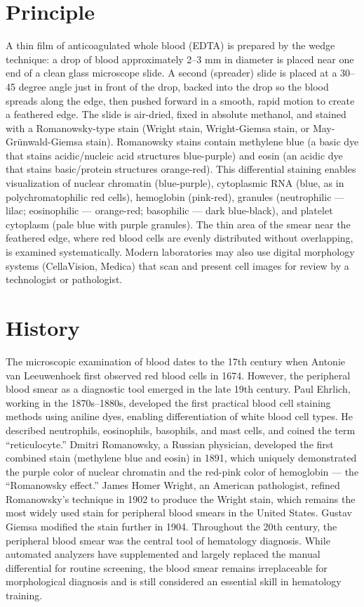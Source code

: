 \section*{Principle}
A thin film of anticoagulated whole blood (EDTA) is prepared by the wedge technique: a drop of blood approximately 2--3 mm in diameter is placed near one end of a clean glass microscope slide. A second (spreader) slide is placed at a 30--45 degree angle just in front of the drop, backed into the drop so the blood spreads along the edge, then pushed forward in a smooth, rapid motion to create a feathered edge. The slide is air-dried, fixed in absolute methanol, and stained with a Romanowsky-type stain (Wright stain, Wright-Giemsa stain, or May-Gr\"{u}nwald-Giemsa stain). Romanowsky stains contain methylene blue (a basic dye that stains acidic/nucleic acid structures blue-purple) and eosin (an acidic dye that stains basic/protein structures orange-red). This differential staining enables visualization of nuclear chromatin (blue-purple), cytoplasmic RNA (blue, as in polychromatophilic red cells), hemoglobin (pink-red), granules (neutrophilic --- lilac; eosinophilic --- orange-red; basophilic --- dark blue-black), and platelet cytoplasm (pale blue with purple granules). The thin area of the smear near the feathered edge, where red blood cells are evenly distributed without overlapping, is examined systematically. Modern laboratories may also use digital morphology systems (CellaVision, Medica) that scan and present cell images for review by a technologist or pathologist.

\section*{History}
The microscopic examination of blood dates to the 17th century when Antonie van Leeuwenhoek first observed red blood cells in 1674. However, the peripheral blood smear as a diagnostic tool emerged in the late 19th century. Paul Ehrlich, working in the 1870s--1880s, developed the first practical blood cell staining methods using aniline dyes, enabling differentiation of white blood cell types. He described neutrophils, eosinophils, basophils, and mast cells, and coined the term ``reticulocyte.'' Dmitri Romanowsky, a Russian physician, developed the first combined stain (methylene blue and eosin) in 1891, which uniquely demonstrated the purple color of nuclear chromatin and the red-pink color of hemoglobin --- the ``Romanowsky effect.'' James Homer Wright, an American pathologist, refined Romanowsky's technique in 1902 to produce the Wright stain, which remains the most widely used stain for peripheral blood smears in the United States. Gustav Giemsa modified the stain further in 1904. Throughout the 20th century, the peripheral blood smear was the central tool of hematology diagnosis. While automated analyzers have supplemented and largely replaced the manual differential for routine screening, the blood smear remains irreplaceable for morphological diagnosis and is still considered an essential skill in hematology training.

